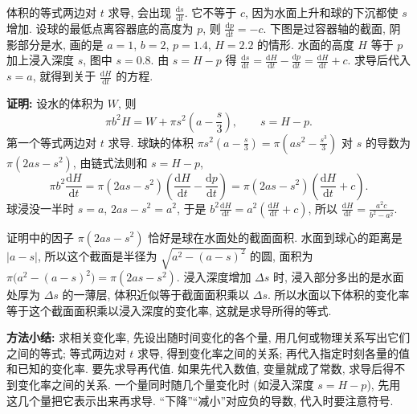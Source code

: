 \documentclass[UTF8,openany]{ctexbook}
\theoremstyle{chinesetextbook}
\newenvironment{cnproof}{\par\indent\textbf{证明:} \ignorespaces}{\par}
\newcommand{\dd}{\mathrm d}
\begin{document}
体积的等式两边对 $t$ 求导, 会出现 $\displaystyle\frac{\dd s}{\dd t}$. 它不等于 $c$, 因为水面上升和球的下沉都使 $s$ 增加. 设球的最低点离容器底的高度为 $p$, 则 $\displaystyle\frac{\dd p}{\dd t}=-c$. 下图是过容器轴的截面, 阴影部分是水, 画的是 $a=1$, $b=2$, $p=1.4$, $H=2.2$ 的情形. 水面的高度 $H$ 等于 $p$ 加上浸入深度 $s$, 图中 $s=0.8$. 由 $s=H-p$ 得 $\displaystyle\frac{\dd s}{\dd t}=\frac{\dd H}{\dd t}-\frac{\dd p}{\dd t}=\frac{\dd H}{\dd t}+c$. 求导后代入 $s=a$, 就得到关于 $\displaystyle\frac{\dd H}{\dd t}$ 的方程.
\begin{center}
\end{center}
\begin{cnproof}
设水的体积为 $W$, 则
\[
\pi b^2H=W+\pi s^2\left(a-\frac s3\right),\qquad s=H-p.
\]
第一个等式两边对 $t$ 求导. 球缺的体积 $\displaystyle\pi s^2\left(a-\frac s3\right)=\pi\left(as^2-\frac{s^3}3\right)$ 对 $s$ 的导数为 $\pi(2as-s^2)$, 由链式法则和 $s=H-p$,
\[
\pi b^2\frac{\dd H}{\dd t}=\pi(2as-s^2)\left(\frac{\dd H}{\dd t}-\frac{\dd p}{\dd t}\right)=\pi(2as-s^2)\left(\frac{\dd H}{\dd t}+c\right).
\]
球浸没一半时 $s=a$, $2as-s^2=a^2$, 于是 $\displaystyle b^2\frac{\dd H}{\dd t}=a^2\left(\frac{\dd H}{\dd t}+c\right)$, 所以 $\displaystyle\frac{\dd H}{\dd t}=\frac{a^2c}{b^2-a^2}$.
\end{cnproof}

证明中的因子 $\pi(2as-s^2)$ 恰好是球在水面处的截面面积. 水面到球心的距离是 $|a-s|$, 所以这个截面是半径为 $\sqrt{a^2-(a-s)^2}$ 的圆, 面积为 $\pi\bigl(a^2-(a-s)^2\bigr)=\pi(2as-s^2)$. 浸入深度增加 $\Delta s$ 时, 浸入部分多出的是水面处厚为 $\Delta s$ 的一薄层, 体积近似等于截面面积乘以 $\Delta s$. 所以水面以下体积的变化率等于这个截面面积乘以浸入深度的变化率, 这就是求导所得的等式.
\par\indent\textbf{方法小结:} 求相关变化率, 先设出随时间变化的各个量, 用几何或物理关系写出它们之间的等式; 等式两边对 $t$ 求导, 得到变化率之间的关系; 再代入指定时刻各量的值和已知的变化率. 要先求导再代值. 如果先代入数值, 变量就成了常数, 求导后得不到变化率之间的关系. 一个量同时随几个量变化时 (如浸入深度 $s=H-p$), 先用这几个量把它表示出来再求导. “下降”“减小”对应负的导数, 代入时要注意符号.
\end{document}
